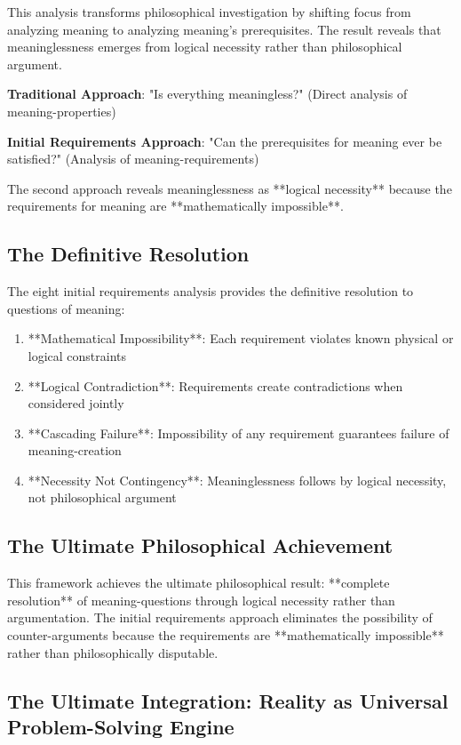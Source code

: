 \documentclass[12pt,a4paper]{article}
\begin{document}
This analysis transforms philosophical investigation by shifting focus from analyzing meaning to analyzing meaning's prerequisites. The result reveals that meaninglessness emerges from logical necessity rather than philosophical argument.

\textbf{Traditional Approach}: "Is everything meaningless?" (Direct analysis of meaning-properties)

\textbf{Initial Requirements Approach}: "Can the prerequisites for meaning ever be satisfied?" (Analysis of meaning-requirements)

The second approach reveals meaninglessness as **logical necessity** because the requirements for meaning are **mathematically impossible**.

\subsection{The Definitive Resolution}

The eight initial requirements analysis provides the definitive resolution to questions of meaning:

\begin{enumerate}
\item **Mathematical Impossibility**: Each requirement violates known physical or logical constraints
\item **Logical Contradiction**: Requirements create contradictions when considered jointly
\item **Cascading Failure**: Impossibility of any requirement guarantees failure of meaning-creation
\item **Necessity Not Contingency**: Meaninglessness follows by logical necessity, not philosophical argument
\end{enumerate}

\subsection{The Ultimate Philosophical Achievement}

This framework achieves the ultimate philosophical result: **complete resolution** of meaning-questions through logical necessity rather than argumentation. The initial requirements approach eliminates the possibility of counter-arguments because the requirements are **mathematically impossible** rather than philosophically disputable.

\subsection{The Ultimate Integration: Reality as Universal Problem-Solving Engine}
\end{document}
